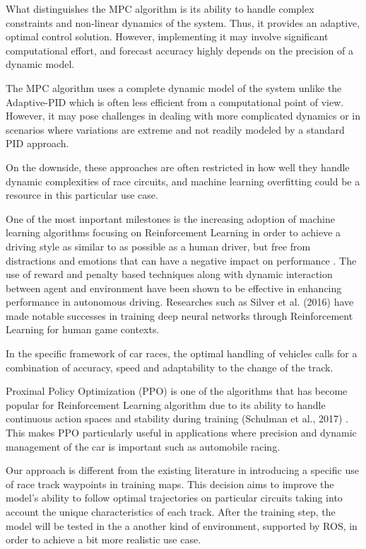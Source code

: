 \documentclass[conference]{IEEEtran}
\begin{document}
\medskip

What distinguishes the MPC algorithm is its ability to handle complex constraints and non-linear dynamics of the system.
%
Thus, it provides an adaptive, optimal control solution.
%
However, implementing it may involve significant computational effort, and forecast accuracy highly depends on the precision of a dynamic model.

\medskip

The MPC algorithm uses a complete dynamic model of the system unlike the Adaptive-PID which is often less efficient from a computational point of view.
%
However, it may pose challenges in dealing with more complicated dynamics or in scenarios where variations are extreme and not readily modeled by a standard PID approach.

On the downside, these approaches are often restricted in how well they handle dynamic complexities of race circuits, and machine learning overfitting could be a resource in this particular use case.

One of the most important milestones is the increasing adoption of machine learning algorithms focusing on Reinforcement Learning in order to achieve a driving style as similar to as possible as a human driver, but free from distractions and emotions that can have a negative impact on performance \cite{andru}.
%
The use of reward and penalty based techniques along with dynamic interaction between agent and environment have been shown to be effective in enhancing performance in autonomous driving.
%
Researches such as Silver et al. (2016) \cite{GO_DNN} have made notable successes in training deep neural networks through Reinforcement Learning for human game contexts.

In the specific framework of car races, the optimal handling of vehicles calls for a combination of accuracy, speed and adaptability to the change of the track.

Proximal Policy Optimization (PPO) is one of the algorithms that has become popular for Reinforcement Learning algorithm due to its ability to handle continuous action spaces and stability during training (Schulman et al., 2017) \cite{PPOOpenAI}.
%
This makes PPO particularly useful in applications where precision and dynamic management of the car is important such as automobile racing.

Our approach is different from the existing literature in introducing a specific use of race track waypoints in training maps.
%
This decision aims to improve the model's ability to follow optimal trajectories on particular circuits taking into account the unique characteristics of each track.
%
After the training step, the model will be tested in the a another kind of environment, supported by ROS, in order to achieve a bit more realistic use case.
\end{document}
